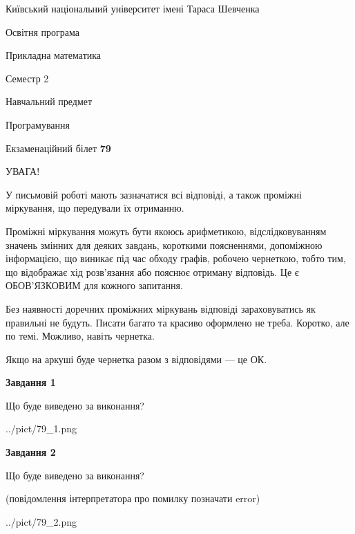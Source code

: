 \documentclass[12pt, ukrainian]{article}
\begin{document}
{{\begin {small}\par
{ \center  Київський національний університет імені Тараса Шевченка \par}
{\parbox {5 cm}{Освітня програма \hfill}{\parbox {7 cm}{Прикладна математика\hfill}}\parbox {6 cm}{\hfill Семестр 2}}\par
{\parbox {5 cm} {Навчальний предмет \hfill}\parbox {7 cm}{Програмування \hfill}\parbox {6cm}{\hfill}\par}\vspace{-7pt} \end{small}}{\center Екзаменаційний білет \No \textbf
{ 79 }\par}}
{
\begin {large}
УВАГА!

У письмовій роботі мають зазначатися всі відповіді, а також проміжні міркування, що передували їх отриманню.

Проміжні міркування можуть бути якоюсь арифметикою, відслідковуванням зна\-чень змінних для деяких завдань,
короткими поясненнями, допоміжною інформацією, що виникає під час обходу графів, робочею чернеткою,
тобто тим, що відображає хід розв’язання або пояснює отриману відповідь.
Це є ОБОВ’ЯЗКОВИМ для кожного запитання.

Без наявності доречних проміжних міркувань відповіді зараховуватись як правиль\-ні не будуть.
Писати багато та красиво оформлено не треба. Коротко, але по темі. Можли\-во, навіть чернетка.

Якщо на аркуші буде чернетка разом з відповідями --- це ОК.

\newpage

{\begin {center}\textbf{Завдання 1}\end {center}}\par
Що буде виведено за виконання?\par
\begin{center}
	{../pict/79_1.png}
\end{center}
\newpage

{\begin {center}\textbf{Завдання 2}\end {center}}\par
Що буде виведено за виконання?\par
 (повідомлення інтерпретатора про помилку позначати error)\par
\begin{center}
	{../pict/79_2.png}
\end{center}
\newpage


\end{large}}
\end{document}
